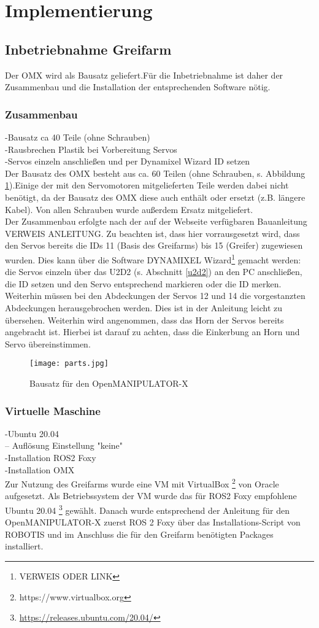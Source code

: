 \section{Implementierung}

\subsection {Inbetriebnahme Greifarm}
Der OMX wird als Bausatz geliefert.Für die Inbetriebnahme ist daher der Zusammenbau und die Installation der entsprechenden Software  nötig. 
\subsubsection{Zusammenbau}
-Bausatz ca 40 Teile (ohne Schrauben)\\
-Rausbrechen Plastik bei Vorbereitung Servos\\
-Servos einzeln anschließen und per Dynamixel Wizard ID setzen\\
Der Bausatz des OMX besteht aus ca. 60 Teilen (ohne Schrauben, s. Abbildung \ref{fig:omxparts}).Einige der mit den Servomotoren mitgelieferten Teile werden dabei nicht benötigt, da der Bausatz des OMX diese auch enthält oder ersetzt (z.B. längere Kabel). Von allen Schrauben wurde außerdem Ersatz mitgeliefert.\\
Der Zusammenbau erfolgte nach der auf der Webseite verfügbaren Bauanleitung VERWEIS ANLEITUNG. Zu beachten ist, dass hier vorrausgesetzt wird, dass den Servos bereits die IDs 11 (Basis des Greifarms) bis 15 (Greifer) zugewiesen wurden. Dies kann über die Software DYNAMIXEL Wizard{\footnote{VERWEIS ODER LINK}} gemacht werden: die Servos einzeln über das U2D2 (s. Abschnitt {\ref{u2d2}}) an den PC anschließen, die ID setzen und den Servo entsprechend markieren oder die ID merken. Weiterhin müssen bei den Abdeckungen der Servos 12 und 14 die vorgestanzten Abdeckungen herausgebrochen werden. Dies ist in der Anleitung leicht zu übersehen. Weiterhin wird angenommen, dass das Horn der Servos bereits angebracht ist. Hierbei ist darauf zu achten, dass die Einkerbung an Horn und Servo übereinstimmen.
\begin{figure}[ht!]
\centering
\texttt{[image: parts.jpg]}
\caption{Bausatz für den OpenMANIPULATOR-X}
\label{fig:omxparts}
\end{figure}
\subsubsection{Virtuelle Maschine}
-Ubuntu 20.04\\
-- Auflösung Einstellung "keine"\\
-Installation ROS2 Foxy\\
-Installation OMX\\
Zur Nutzung des Greifarms wurde eine \ac{VM} mit VirtualBox {\footnote{https://www.virtualbox.org}} von Oracle aufgesetzt. Als Betriebssystem der \ac{VM} wurde das für ROS2 Foxy empfohlene \citep{foxyreq} Ubuntu 20.04 {\footnote{\url{https://releases.ubuntu.com/20.04/}}} gewählt. Danach wurde entsprechend der Anleitung für den OpenMANIPULATOR-X \citep{foxyinstall} zuerst ROS 2 Foxy über das Installations-Script von ROBOTIS und im Anschluss die für den Greifarm benötigten Packages installiert.
